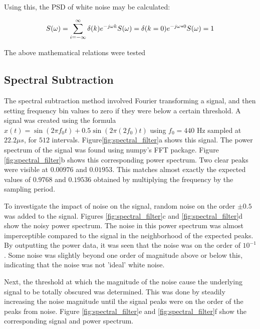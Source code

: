 \documentclass[twocolumn]{article}
\begin{document}
Using this, the PSD of white noise may be calculated:

\[ S(\omega) =  \sum_{i=-\infty}^{\infty} \delta (k) e^{-j\omega k}\\
S(\omega) = \delta(k=0) e^{-j\omega * 0} \\
S(\omega) = 1
\] 

The above mathematical relations were tested 


\subsection{Spectral Subtraction}
The spectral subtraction method involved Fourier transforming a signal, and then setting frequency bin values to zero if they were below a certain threshold. A signal was created using the formula $ x(t) = \sin (2\pi f_0t) + 0.5\sin (2\pi (2f_0)t)$ using $f_0=440$ Hz sampled at $22.2\mu s$, for $512$ intervals. Figure\ref{fig:spectral_filter}a shows this signal. The power spectrum of the signal was found using numpy's FFT package. Figure \ref{fig:spectral_filter}b shows this corresponding power spectrum. Two clear peaks were visible at $0.00976$ and $0.01953$. This matches almost exactly the expected values of $0.9768$ and $0.19536$ obtained by multiplying the frequency by the sampling period.

To investigate the impact of noise on the signal, random noise on the order $\pm 0.5$ was added to the signal. Figures \ref{fig:spectral_filter}c and \ref{fig:spectral_filter}d show the noisy power spectrum. The noise in this power spectrum was almost imperceptible compared to the signal in the neighborhood of the expected peaks. By outputting the power data, it was seen that the noise was on the order of $10^{-1}$. Some noise was slightly beyond one order of magnitude above or below this, indicating that the noise was not 'ideal' white noise.

Next, the threshold at which the magnitude of the noise cause the underlying signal to be totally obscured was determined. This was done by steadily increasing the noise magnitude until the signal peaks were on the order of the peaks from noise. Figure \ref{fig:spectral_filter}e and \ref{fig:spectral_filter}f show the corresponding signal and power spectrum.
\end{document}
